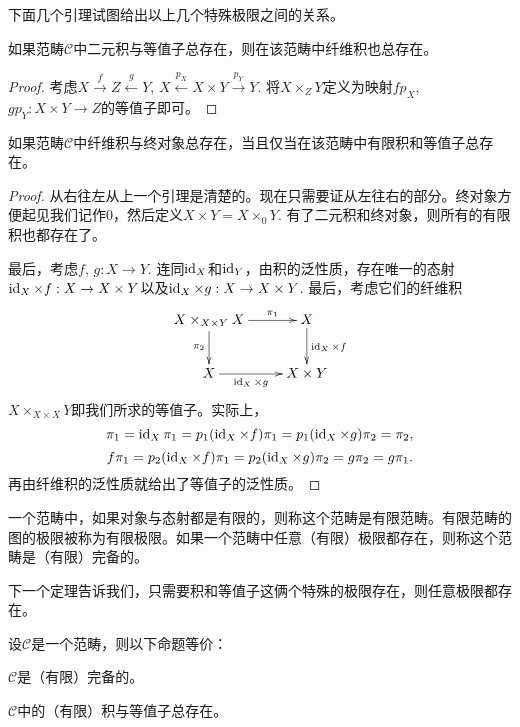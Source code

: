 下面几个引理试图给出以上几个特殊极限之间的关系。

\begin{lem}
如果范畴$\mathcal{C}$中二元积与等值子总存在，则在该范畴中纤维积也总存在。
\end{lem}

\begin{proof}
考虑$X\xrightarrow{f} Z \xleftarrow{g} Y$, $X\xleftarrow{p_X}X\times Y\xrightarrow{p_Y} Y$. 将$X\times_Z Y$定义为映射$fp_X$, $gp_Y: X\times Y\to Z$的等值子即可。
\end{proof}

\begin{lem}
如果范畴$\mathcal{C}$中纤维积与终对象总存在，当且仅当在该范畴中有限积和等值子总存在。
\end{lem}

\begin{proof}
从右往左从上一个引理是清楚的。现在只需要证从左往右的部分。终对象方便起见我们记作$0$，然后定义$X\times Y=X\times_0 Y$. 有了二元积和终对象，则所有的有限积也都存在了。

最后，考虑$f$, $g:X\to Y$. 连同$\operatorname{id}_X$和$\operatorname{id}_Y$，由积的泛性质，存在唯一的态射$\operatorname{id}_X\times f:X \to X\times Y$以及$\operatorname{id}_X\times g:X \to X\times Y$. 最后，考虑它们的纤维积
\[
\begin{xy}
	\xymatrix{
	X\times_{X\times Y} X\ar[d]_{\pi_2}\ar[r]^-{\pi_1}&X\ar[d]^{\id_X\times f}\\
	X\ar[r]_-{\id_X\times g}& X\times Y
	}
\end{xy}
\]
$X\times_{X\times X} Y$即我们所求的等值子。实际上，
\[
	\pi_1=\operatorname{id}_X\pi_1=p_1(\operatorname{id}_X\times f)\pi_1=p_1(\operatorname{id}_X\times g)\pi_2=\pi_2,
\]
\[
	f\pi_1=p_2(\operatorname{id}_X\times f)\pi_1=p_2(\operatorname{id}_X\times g)\pi_2=g\pi_2=g\pi_1.
\]
再由纤维积的泛性质就给出了等值子的泛性质。
\end{proof}

\begin{para}
一个范畴中，如果对象与态射都是有限的，则称这个范畴是有限范畴。有限范畴的图的极限被称为有限极限。如果一个范畴中任意（有限）极限都存在，则称这个范畴是（有限）完备的。
\end{para}

下一个定理告诉我们，只需要积和等值子这俩个特殊的极限存在，则任意极限都存在。

\begin{thm}\label{wanbei}
设$\mathcal{C}$是一个范畴，则以下命题等价：
\begin{compactenum}[~~~~(1)]
\item $\mathcal{C}$是（有限）完备的。
\item $\mathcal{C}$中的（有限）积与等值子总存在。
\end{compactenum}
\end{thm}

